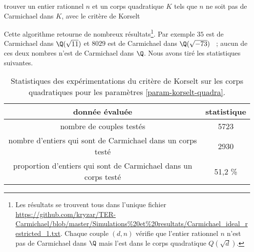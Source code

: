 \vspace{1em}
\begin{algorithm}[H]
\caption{trouver un entier rationnel $n$ et un corps quadratique $K$ tels que $n$ ne soit pas de Carmichael dans $K$, avec le critère de Korselt}
\end{algorithm}
\vspace{1em}

Cette algorithme retourne de nombreux résultats\footnote{Les résultats se trouvent tous dans l'unique fichier \url{https://github.com/kryzar/TER-Carmichael/blob/master/Simulations\%20et\%20resultats/Carmichael\_ideal\_restricted\_1.txt}. Chaque couple $(d, n)$ vérifie que l'entier rationnel $n$ n'est pas de Carmichael dans $\Q$ mais l'est dans le corps quadratique $Q(\sqrt{d})$.}. Par exemple $35$ est de Carmichael dans $\Q(\sqrt{11})$ et $8029$ est de Carmichael dans $\Q(\sqrt{-73})$ ~; aucun de ces deux nombres n'est de Carmichael dans $\Q$. Nous avons tiré les statistiques suivantes.

\begin{table}[H]
	\begin{center}
		\begin{tabular}{|c|c|}
			\hline
			donnée évaluée & statistique \\
			\hline
			\hline
			nombre de couples testés & 5723 \\\hline
			nombre d'entiers qui sont de Carmichael dans un corps testé & 2930 \\\hline
			proportion d'entiers qui sont de Carmichael dans un corps testé & 51,2 \% \\\hline
		\end{tabular}
		\caption{Statistiques des expérimentations du critère de Korselt sur les corps quadratiques pour les paramètres \ref{param-korselt-quadra}.}
	\end{center}
\end{table}

